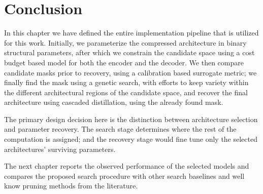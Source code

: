 \section{Conclusion}
\label{chap:methodology_conclusion}

In this chapter we have defined the entire implementation pipeline that is utilized for this work. Initially, we parameterize the compressed architecture in binary structural parameters, after which we constrain the candidate space using a cost budget based model for both the encoder and the decoder. We then compare candidate masks prior to recovery, using a calibration based surrogate metric; we finally find the mask using a genetic search, with efforts to keep variety within the different architectural regions of the candidate space, and recover the final architecture using cascaded distillation, using the already found mask.

The primary design decision here is the distinction between architecture selection and parameter recovery. The search stage determines where the rest of the computation is assigned; and the recovery stage would fine tune only the selected architectures' surviving parameters.

The next chapter reports the observed performance of the selected models and compares the proposed search procedure with other search baselines and well know pruning methods from the literature.

